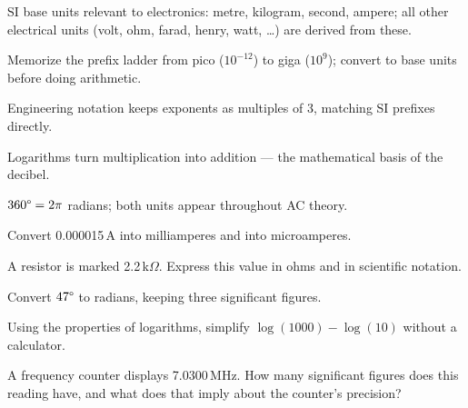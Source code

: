 \begin{quickreview}
\item SI base units relevant to electronics: metre, kilogram, second,
ampere; all other electrical units (volt, ohm, farad, henry, watt, \dots)
are derived from these.
\item Memorize the prefix ladder from pico ($10^{-12}$) to giga
($10^{9}$); convert to base units before doing arithmetic.
\item Engineering notation keeps exponents as multiples of 3, matching SI
prefixes directly.
\item Logarithms turn multiplication into addition --- the mathematical
basis of the decibel.
\item $360\degree = 2\pi$ radians; both units appear throughout AC theory.
\end{quickreview}

\begin{practiceproblems}
\item Convert 0.000015\,A into milliamperes and into microamperes.
\item A resistor is marked 2.2\,k$\Omega$. Express this value in ohms and
in scientific notation.
\item Convert $47\degree$ to radians, keeping three significant figures.
\item Using the properties of logarithms, simplify $\log(1000) - \log(10)$
without a calculator.
\item A frequency counter displays 7.0300\,MHz. How many significant
figures does this reading have, and what does that imply about the
counter's precision?
\end{practiceproblems}
